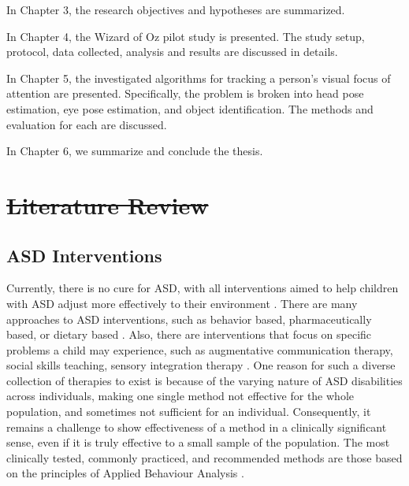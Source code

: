 \documentclass{ut-thesis}
\providecommand{\DIFdeltex}[1]{{\protect\color{red}\sout{#1}}}                      %
\providecommand{\DIFdelbegin}{} %
\providecommand{\DIFdelend}{} %
\providecommand{\DIFdel}[1]{\texorpdfstring{\DIFdeltex{#1}}{}} %
\begin{document}
In Chapter 3, the research objectives and hypotheses are summarized.

In Chapter 4, the Wizard of Oz pilot study is presented.  The study setup, protocol, data collected, analysis and results are discussed in details.

In Chapter 5, the investigated algorithms for tracking a person's visual focus of attention are presented.  Specifically, the problem is broken into head pose estimation, eye pose estimation, and object identification.  The methods and evaluation for each are discussed.

In Chapter 6, we summarize and conclude the thesis.




\DIFdelbegin \chapter{\DIFdel{Literature Review}}
\addtocounter{chapter}{-1}%
\DIFdelend %

\section{ASD Interventions}

Currently, there is no cure for ASD, with all interventions aimed to help children with ASD adjust more effectively to their environment \cite{francis2005autism}.  There are many approaches to ASD interventions, such as behavior based, pharmaceutically based, or dietary based \cite{francis2005autism}.  Also, there are interventions that focus on specific problems a child may experience, such as augmentative communication therapy, social skills teaching, sensory integration therapy \cite{francis2005autism}.  One reason for such a diverse collection of therapies to exist is because of the varying nature of ASD disabilities across individuals, making one single method not effective for the whole population, and sometimes not sufficient for an individual.  Consequently, it remains a challenge to show effectiveness of a method in a clinically significant sense, even if it is truly effective to a small sample of the population.  The most clinically tested, commonly practiced, and recommended methods are those based on the principles of Applied Behaviour Analysis \cite{foxx2008applied}.
\end{document}
